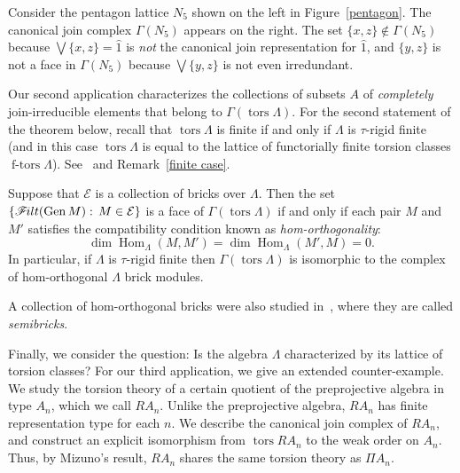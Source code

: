\documentclass[ALCO,ThmDefs,Unicode,epreuves]{cedram}
\DeclareMathOperator{\tors}{tors}
\DeclareMathOperator{\Hom}{Hom}
\newcommand{\calE}{\mathcal{E}}
\newcommand{\filt}{\mathscr{F}\Mk ilt}
\renewcommand{\Join}{\bigvee}
\newcommand{\Gen}{\operatorname{Gen}}
\newcommand{\ftors}{\operatorname{f-tors}}
\renewcommand{\1}{\hat{1}}
\newcommand{\0}{\hat{0}}
\newcommand{\newword}[1]{\emph{#1}}
\newcommand*{\Mk}{\mkern -2mu}
\begin{document}
\begin{example}\label{ex: canonical join complex}
\normalfont
Consider the pentagon lattice $N_5$ shown on the left in Figure~\ref{pentagon}.
The canonical join complex $\Gamma(N_5)$ appears on the right.
The set $\{x,z\}\not\in\Gamma(N_5)$ because $\Join \{x,z\} = \1$ is \emph{not} the canonical join representation for $\1$, and $\{y,z\}$ is not a face in $\Gamma(N_5)$ because $\Join \{y,z\}$ is not even irredundant.
\end{example}


Our second application characterizes the collections of subsets $A$ of \emph{completely} join-irreducible elements that belong to $\Gamma(\tors \Lambda)$.
For the second statement of the theorem below, recall that $\tors \Lambda$ is finite if and only if $\Lambda$ is $\tau$-rigid finite (and in this case $\tors \Lambda$ is equal to the lattice of functorially finite torsion classes $\ftors \Lambda$).
See~\cite{IRTT} and Remark~\ref{finite case}.
\begin{theorem}\label{main: cjr}
Suppose that $\calE$ is a collection of bricks over $\Lambda$.
Then the set $\{\filt(\Gen M):\, M\in \calE\}$ is a face of $\Gamma(\tors \Lambda)$ if and only if each pair $M$ and $M'$ satisfies the compatibility condition known as \newword{hom-orthogonality}:
\[
\dim \Hom_{\Lambda}(M, M') = \dim \Hom_{\Lambda}(M', M) =0.
\]
In particular, if $\Lambda$ is $\tau$-rigid finite then $\Gamma(\tors \Lambda)$ is isomorphic to the complex of hom-orthogonal $\Lambda$ brick modules.
\end{theorem}

A collection of hom-orthogonal bricks were also studied in~\cite{Asai}, where they are called \emph{semibricks}.


Finally, we consider the question:
Is the algebra $\Lambda$ characterized by its lattice of torsion classes?
For our third application, we give an extended counter-example.
We study the torsion theory of a certain quotient of the preprojective algebra in type $A_n$, which we call $RA_n$.
Unlike the preprojective algebra, $RA_n$ has finite representation type for each $n$.
We describe the canonical join complex of $RA_n$, and construct an explicit isomorphism from $\tors RA_n$ to the weak order on $A_n$. 
Thus, by Mizuno's result, $RA_n$ shares the same torsion theory as $\Pi A_n$.
\end{document}
